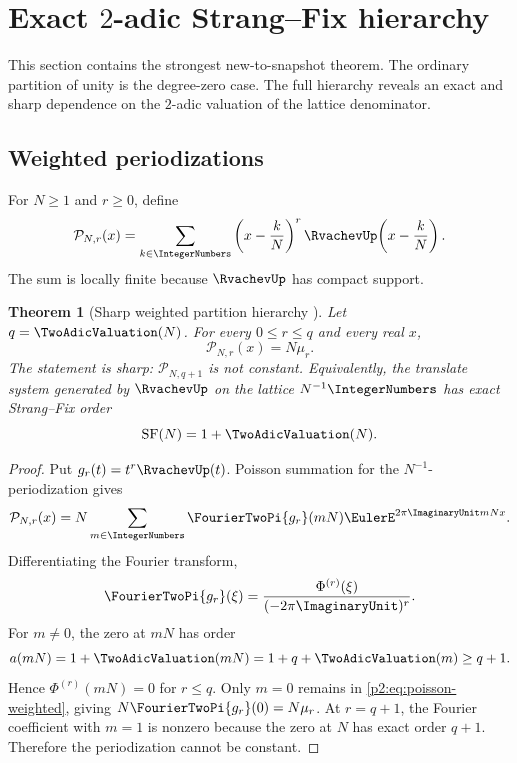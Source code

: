 \documentclass[11pt]{article}
\numberwithin{equation}{section}
\newtheorem{theorem}{Theorem}[section]
\theoremstyle{definition}
\theoremstyle{remark}
\begin{document}
\section{Exact $2$-adic Strang--Fix hierarchy}
\label{p2:sec:weighted}

This section contains the strongest new-to-snapshot theorem.  The ordinary
partition of unity is the degree-zero case.  The full hierarchy reveals an exact
and sharp dependence on the $2$-adic valuation of the lattice denominator.

\subsection{Weighted periodizations}

For $N\ge1$ and $r\ge0$, define
\begin{equation}
 \mathcal P_{N,r}(x)=
 \sum_{k\in\IntegerNumbers}\left(x-\frac{k}{N}\right)^r
 \RvachevUp\!\left(x-\frac{k}{N}\right).                         \label{p2:eq:periodization}
\end{equation}
The sum is locally finite because $\RvachevUp$ has compact support.

\begin{theorem}[Sharp weighted partition hierarchy \NewResult]
\label{p2:thm:weighted}
Let $q=\TwoAdicValuation(N)$.  For every $0\le r\le q$ and every real $x$,
\begin{equation}
 \boxed{\mathcal P_{N,r}(x)=N\mu_r.}                       \label{p2:eq:weighted-constant}
\end{equation}
The statement is sharp: $\mathcal P_{N,q+1}$ is not constant.  Equivalently, the
translate system generated by $\RvachevUp$ on the lattice $N^{-1}\IntegerNumbers$ has exact
Strang--Fix order
\begin{equation}
 \operatorname{SF}(N)=1+\TwoAdicValuation(N).                          \label{p2:eq:SF-order}
\end{equation}
\end{theorem}

\begin{proof}
Put $g_r(t)=t^r\RvachevUp(t)$.  Poisson summation for the $N^{-1}$-periodization gives
\begin{equation}
 \mathcal P_{N,r}(x)=N\sum_{m\in\IntegerNumbers}
 \FourierTwoPi{g_r}(mN)\EulerE^{2\pi\ImaginaryUnit mNx}.                        \label{p2:eq:poisson-weighted}
\end{equation}
Differentiating the Fourier transform,
\begin{equation}
 \FourierTwoPi{g_r}(\xi)=\frac{\Phi^{(r)}(\xi)}{(-2\pi\ImaginaryUnit)^r}.  \label{p2:eq:moment-fourier}
\end{equation}
For $m\ne0$, the zero at $mN$ has order
\[
 a(mN)=1+\TwoAdicValuation(mN)=1+q+\TwoAdicValuation(m)\ge q+1.
\]
Hence $\Phi^{(r)}(mN)=0$ for $r\le q$.  Only $m=0$ remains in
\eqref{p2:eq:poisson-weighted}, giving $N\FourierTwoPi{g_r}(0)=N\mu_r$.
At $r=q+1$, the Fourier coefficient with $m=1$ is nonzero because the zero at
$N$ has exact order $q+1$.  Therefore the periodization cannot be constant.
\end{proof}
\end{document}
